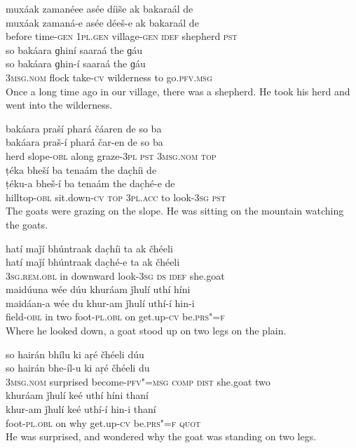 \begin{exe}
\ex
\label{ex:1}
\glll muxáak	zamanéee	asée	díiše	ak	bakaraál	de \\
muxáak	zamaná-e	asée	déeš-e	ak	bakaraál	de \\
before	time-\textsc{gen} \textsc{1pl.gen}	village-\textsc{gen}	\textsc{idef}	shepherd	\textsc{pst} \\
\glll so	bakáara	ɡhiní	saaraá	the	ɡáu \\
so	bakáara	ɡhin-í	saaraá	the	ɡáu \\
\textsc{3msg.nom}	flock	take-\textsc{cv}	wilderness	to	go.\textsc{pfv.msg} \\
\glt Once a long time ago in our village, there was a shepherd. He took his herd and went into the wilderness.

\ex
\label{ex:2}
\glll bakáara	praší	phará	čáaren	de	so	ba \\
bakáara	praš-í	phará	čar-en	de	so	ba \\
herd	slope-\textsc{obl}	along	graze-\textsc{3pl} \textsc{pst} \textsc{3msg.nom}	\textsc{top} \\
\glll ṭéka	bheší	ba	tenaám	the	dac̣híi	de \\
ṭéku-a	bheš-í	ba	tenaám	the	dac̣hé-e	de \\
hilltop-\textsc{obl}	sit.down-\textsc{cv} \textsc{top}	\textsc{3pl.acc}	to	look-\textsc{3sg} \textsc{pst} \\
\glt The goats were grazing on the slope. He was sitting on the mountain watching the goats.

\ex
\label{ex:3}
\glll hatí	maǰí	bhúntraak	dac̣híi	ta	ak	čhéeli \\
hatí	maǰí	bhúntraak	dac̣hé-e	ta	ak	čhéeli \\
\textsc{3sg.rem.obl}	in	downward	look-\textsc{3sg} \textsc{ds} \textsc{idef}	she.goat \\
\glll maidúuna	wée	dúu	khuráam	ǰhulí	uthí	híni \\
maidáan-a	wée	du	khur-am	ǰhulí	uthí-í	hin-i \\
field-\textsc{obl}	in	two	foot-\textsc{pl.obl}	on	get.up-\textsc{cv}	be.\textsc{prs"=f} \\
\glt Where he looked down, a goat stood up on two legs on the plain.

\ex
\label{ex:4}
\glll so	hairán	bhílu	ki	aṛé	čhéeli	dúu \\
so	hairán	bhe-íl-u	ki	aṛé	čhéeli	du \\
\textsc{3msg.nom}	surprised	become-\textsc{pfv"=msg}  \textsc{comp}	\textsc{dist}	she.goat	two \\
\glll khuráam	ǰhulí	keé	uthí	híni	thaní \\
khur-am	ǰhulí	keé	uthí-í	hin-i	thaní \\
foot-\textsc{pl.obl}	on	why	get.up-\textsc{cv}	be.\textsc{prs"=f} \textsc{quot} \\
\glt He was surprised, and wondered why the goat was standing on two legs.


\end{exe}
